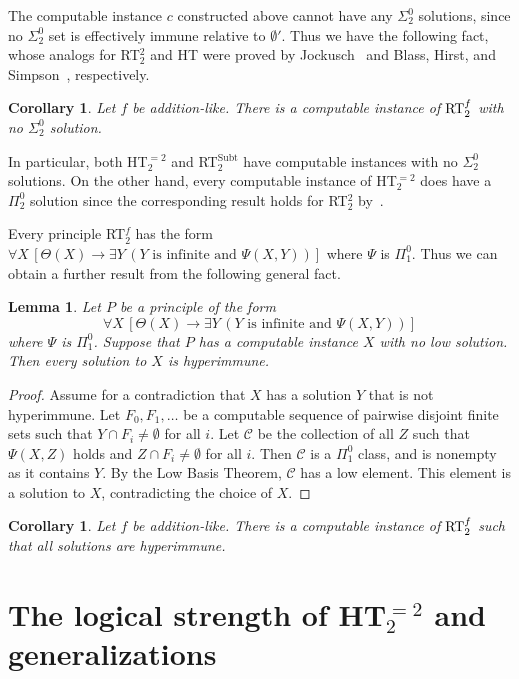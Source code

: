 \documentclass{amsart}
\newtheorem{cor}[thm]{Corollary}
\newtheorem{lem}[thm]{Lemma}
\theoremstyle{definition}
\DeclareMathOperator{\subt}{Subt}
\begin{document}
The computable instance $c$ constructed above cannot have any
$\Sigma^0_2$ solutions, since no $\Sigma^0_2$ set is effectively
immune relative to $\emptyset'$. Thus we have the following fact,
whose analogs for RT$^2_2$ and HT were proved by Jockusch~\cite{J} and
Blass, Hirst, and Simpson~\cite{BHS}, respectively.

\begin{cor}
Let $f$ be addition-like. There is a computable instance of
$\textup{RT}^f_2$ with no $\Sigma^0_2$ solution.
\end{cor}

In particular, both HT$^{=2}_2$ and RT$^{\subt}_2$ have computable
instances with no $\Sigma^0_2$ solutions. On the other hand, every
computable instance of HT$^{=2}_2$ does have a $\Pi^0_2$ solution
since the corresponding result holds for RT$^2_2$ by~\cite{J}.

Every principle RT$^f_2$ has the form $\forall X\,[\Theta(X)
\rightarrow \exists Y\, (Y \mbox{ is infinite and } \Psi(X,Y))]$
where $\Psi$ is $\Pi^0_1$. Thus we can obtain a further result from
the following general fact.

\begin{lem}
Let $P$ be a principle of the form \[\forall X\,[\Theta(X)
\rightarrow \exists Y\, (Y \mbox{ is infinite and } \Psi(X,Y))]\]
where $\Psi$ is $\Pi^0_1$. Suppose that $P$ has a
computable instance $X$ with no low solution. Then every solution to
$X$ is hyperimmune.
\end{lem}

\begin{proof}
Assume for a contradiction that $X$ has a solution $Y$ that is not
hyperimmune. Let $F_0,F_1,\ldots$ be a computable sequence of pairwise
disjoint finite sets such that $Y \cap F_i \neq \emptyset$ for all
$i$. Let $\mathcal C$ be the collection of all $Z$ such that
$\Psi(X,Z)$ holds and $Z \cap F_i \neq \emptyset$ for all $i$. Then
$\mathcal C$ is a $\Pi^0_1$ class, and is nonempty as it contains
$Y$. By the Low Basis Theorem, $\mathcal C$ has a low element. This
element is a solution to $X$, contradicting the choice of $X$.
\end{proof}

\begin{cor}
Let $f$ be addition-like. There is a computable instance of
$\textup{RT}^f_2$ such that all solutions are hyperimmune.
\end{cor}


\section{The logical strength of HT$^{=2}_2$ and generalizations}
\end{document}
